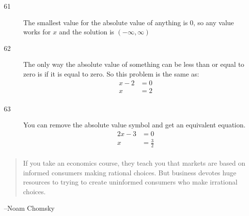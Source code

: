 \documentclass[letterpaper, landscape]{exam}
\begin{document}
\begin{description}
      \item[61] The smallest value for the absolute value of anything is 0, so any value works for
        $x$ and the solution is $(-\infty, \infty)$

      \item[62] The only way the absolute value of something can be less than or equal to zero is if
        it is equal to zero. So this problem is the same as:
        \begin{align*}
          x - 2 & = 0 \\
          x     & = 2 \\
        \end{align*}

      \item[63] You can remove the absolute value symbol and get an equivalent equation.
        \begin{align*}
          2x - 3 & = 0 \\
          x      & = \frac{3}{2} \\
        \end{align*}

    \end{description}
  \fi

  \ifprintanswers{}
  \else
    \vspace{8 cm}
    \begin{quote}
      \begin{em}
        If you take an economics course, they teach you that markets are based
        on informed consumers making rational choices.  But business devotes
        huge resources to trying to create uninformed consumers who make
        irrational choices.
      \end{em}
    \end{quote}
    \hspace{1 cm} --Noam Chomsky
  \fi
\end{document}
